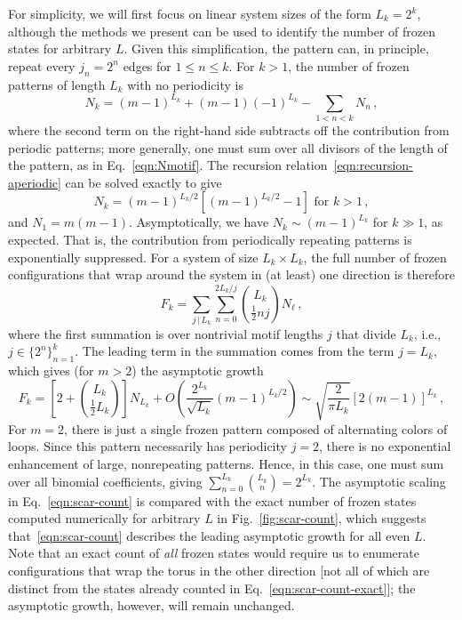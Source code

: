 For simplicity, we will first focus on linear system sizes of the form $L_k = 2^k$, although the methods we present can be used to identify the number of frozen states for arbitrary $L$.
Given this simplification, the pattern can, in principle, repeat every $j_n = 2^n$ edges for $1 \leq n \leq k$. For $k > 1$, the number of frozen patterns of length $L_k$ with no periodicity is
%
%
\begin{equation}
    N_{k} = (m-1)^{L_k} + (m-1)(-1)^{L_k} - \sum_{1 < n < k} N_n
    \, ,
    \label{eqn:recursion-aperiodic}
\end{equation}
%
%
where the second term on the right-hand side subtracts off the contribution from periodic patterns; more generally, one must sum over all divisors of the length of the pattern, as in Eq.~\eqref{eqn:Nmotif}.
The recursion relation~\eqref{eqn:recursion-aperiodic} can be solved exactly to give
%
%
\begin{equation}
    N_k = (m-1)^{L_k/2} \left[ (m-1)^{L_k/2} - 1 \right] \text{ for } k>1
    \, ,
\end{equation}
%
%
and $N_1 = m(m-1)$. Asymptotically, we have $N_k \sim (m-1)^{L_k}$ for $k \gg 1$, as expected. That is, the contribution from periodically repeating patterns is exponentially suppressed.
For a system of size $L_k \times L_k$, the full number of frozen configurations that wrap around the system in (at least) one direction is therefore  
%
%
\begin{equation}
    F_k = \sum_{j \, | \, L_k } \sum_{n=0}^{2L_k/j}  \binom{L_k}{\frac12 n j} N_{\ell}
    \, ,
    \label{eqn:scar-count-exact}
\end{equation}
%
%
where the first summation is over nontrivial motif lengths $j$ that divide $L_k$, i.e., $j \in \{2^n\}_{n=1}^k$.
The leading term in the summation comes from the term $j = L_k$, which gives (for $m>2$) the asymptotic growth
%
%
\begin{equation}
    F_k = \left[ 2 + \binom{L_k}{\frac12 L_k} \right] N_{L_k} + O\left( \frac{ 2^{L_k} }{\sqrt{L_k}} (m-1)^{L_k/2} \right) \sim \sqrt{\frac{2}{{\pi L_k}}} [2(m-1)]^{L_k} 
    \, ,
    \label{eqn:scar-count}
\end{equation}
%
%
For $m=2$, there is just a single frozen pattern composed of alternating colors of loops. Since this pattern necessarily has periodicity $j=2$, there is no exponential enhancement of large, nonrepeating patterns. Hence, in this case, one must sum over all binomial coefficients, giving $\sum_{n=0}^{L_k} \binom{L_k}{n} = 2^{L_k}$.
The asymptotic scaling in Eq.~\eqref{eqn:scar-count} is compared with the exact number of frozen states computed numerically for arbitrary $L$ in Fig.~\ref{fig:scar-count}, which suggests that~\eqref{eqn:scar-count} describes the leading asymptotic growth for all even $L$. Note that an exact count of \emph{all} frozen states would require us to enumerate configurations that wrap the torus in the other direction [not all of which are distinct from the states already counted in Eq.~\eqref{eqn:scar-count-exact}]; the asymptotic growth, however, will remain unchanged. 


